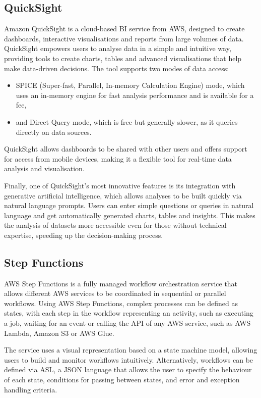 \subsection{QuickSight}
Amazon QuickSight is a cloud-based \ac{BI} service from \ac{AWS}, designed to create dashboards, interactive visualisations and reports from large volumes of data. QuickSight empowers users to analyse data in a simple and intuitive way, providing tools to create charts, tables and advanced visualisations that help make data-driven decisions.
The tool supports two modes of data access:
\begin{itemize}
    \item SPICE (Super-fast, Parallel, In-memory Calculation Engine) mode, which uses an in-memory engine for fast analysis performance and is available for a fee,
    \item and Direct Query mode, which is free but generally slower, as it queries directly on data sources.
\end{itemize}
QuickSight allows dashboards to be shared with other users and offers support for access from mobile devices, making it a flexible tool for real-time data analysis and visualisation.

Finally, one of QuickSight's most innovative features is its integration with generative artificial intelligence, which allows analyses to be built quickly via natural language prompts. Users can enter simple questions or queries in natural language and get automatically generated charts, tables and insights. This makes the analysis of datasets more accessible even for those without technical expertise, speeding up the decision-making process.
\subsection{Step Functions}
\ac{AWS} Step Functions is a fully managed workflow orchestration service that allows different \ac{AWS} services to be coordinated in sequential or parallel workflows. Using \ac{AWS} Step Functions, complex processes can be defined as states, with each step in the workflow representing an activity, such as executing a job, waiting for an event or calling the API of any \ac{AWS} service, such as \ac{AWS} Lambda, Amazon \ac{S3} or \ac{AWS} Glue.

The service uses a visual representation based on a state machine model, allowing users to build and monitor workflows intuitively. Alternatively, workflows can be defined via \ac{ASL}, a \ac{JSON} language that allows the user to specify the behaviour of each state, conditions for passing between states, and error and exception handling criteria.

